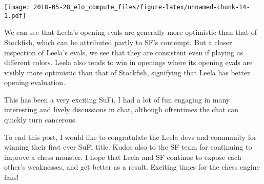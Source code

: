 \documentclass[]{article}
\begin{document}
\texttt{[image: 2018-05-28\_elo\_compute\_files/figure-latex/unnamed-chunk-14-1.pdf]}

We can see that Leela's opening evals are generally more optimistic than
that of Stockfish, which can be attributed partly to SF's contempt. But
a closer inspection of Leela's evals, we see that they are consistent
even if playing as different colors. Leela also tends to win in openings
where its opening evals are visibly more optimistic than that of
Stockfish, signifying that Leela has better opening evaluation.

This has been a very exciting SuFi. I had a lot of fun engaging in many
interesting and lively discussions in chat, although oftentimes the chat
can quickly turn cancerous.

To end this post, I would like to congratulate the Leela devs and
community for winning their first ever SuFi title. Kudos also to the SF
team for continuing to improve a chess monster. I hope that Leela and SF
continue to expose each other's weaknesses, and get better as a result.
Exciting times for the chess engine fans!
\end{document}
